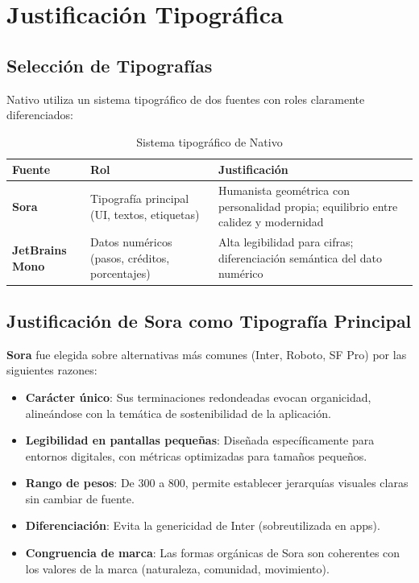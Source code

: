 \documentclass[12pt, a4paper]{article}
\begin{document}
\newpage
\section{Justificación Tipográfica}

\subsection{Selección de Tipografías}

Nativo utiliza un sistema tipográfico de dos fuentes con roles claramente diferenciados:

\begin{table}[H]
\centering
\caption{Sistema tipográfico de Nativo}
\begin{tabularx}{\textwidth}{>{\bfseries}l X X}
\toprule
\textbf{Fuente} & \textbf{Rol} & \textbf{Justificación} \\
\midrule
\textbf{Sora} & Tipografía principal (UI, textos, etiquetas) & Humanista geométrica con personalidad propia; equilibrio entre calidez y modernidad \\
\addlinespace
\textbf{JetBrains Mono} & Datos numéricos (pasos, créditos, porcentajes) & Alta legibilidad para cifras; diferenciación semántica del dato numérico \\
\bottomrule
\end{tabularx}
\end{table}

\subsection{Justificación de Sora como Tipografía Principal}

\begin{justificacionbox}
\textbf{Sora} fue elegida sobre alternativas más comunes (Inter, Roboto, SF Pro) por las siguientes razones:

\begin{itemize}
  \item \textbf{Carácter único}: Sus terminaciones redondeadas evocan organicidad, alineándose con la temática de sostenibilidad de la aplicación.
  \item \textbf{Legibilidad en pantallas pequeñas}: Diseñada específicamente para entornos digitales, con métricas optimizadas para tamaños pequeños.
  \item \textbf{Rango de pesos}: De 300 a 800, permite establecer jerarquías visuales claras sin cambiar de fuente.
  \item \textbf{Diferenciación}: Evita la genericidad de Inter (sobreutilizada en apps).
  \item \textbf{Congruencia de marca}: Las formas orgánicas de Sora son coherentes con los valores de la marca (naturaleza, comunidad, movimiento).
\end{itemize}
\end{justificacionbox}
\end{document}
